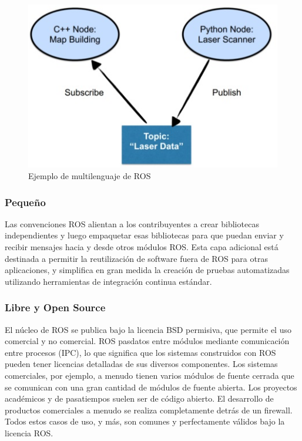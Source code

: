             \begin{figure}[htb]
                \centering
                \includegraphics[width=0.5\linewidth]{Main/Chapter3/Images3/multilenguaje_1.png}
                \caption{Ejemplo de multilenguaje de ROS}
                \label{f:Cap3-5_multilenguaje_ros}
            \end{figure}

\newpage
            
        \subsubsection{Pequeño}
        
            Las convenciones ROS alientan a los contribuyentes a crear bibliotecas independientes y luego empaquetar esas bibliotecas para que puedan enviar y recibir mensajes hacia y desde otros módulos ROS. Esta capa adicional está destinada a permitir la reutilización de software fuera de ROS para otras aplicaciones, y simplifica en gran medida la creación de pruebas automatizadas utilizando herramientas de integración continua estándar.
            
        \subsubsection{Libre y Open Source}
        
            El núcleo de ROS se publica bajo la licencia BSD permisiva, que permite el uso comercial y no comercial. ROS pas\subsua datos entre módulos mediante comunicación entre procesos (IPC), lo que significa que los sistemas construidos con ROS pueden tener licencias detalladas de sus diversos componentes. Los sistemas comerciales, por ejemplo, a menudo tienen varios módulos de fuente cerrada que se comunican con una gran cantidad de módulos de fuente abierta. Los proyectos académicos y de pasatiempos suelen ser de código abierto. El desarrollo de productos comerciales a menudo se realiza completamente detrás de un firewall. Todos estos casos de uso, y más, son comunes y perfectamente válidos bajo la licencia ROS.
            
